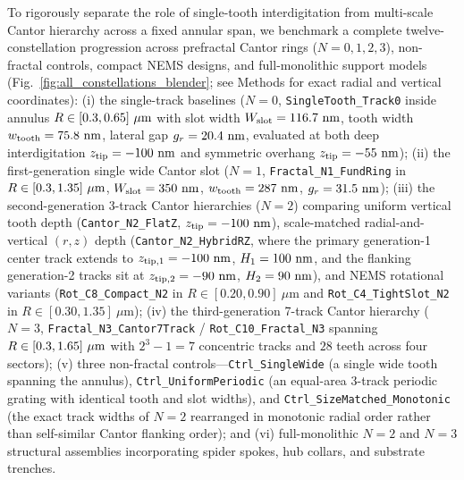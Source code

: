 \documentclass[11pt,letterpaper]{article}
\begin{document}
To rigorously separate the role of single-tooth interdigitation from multi-scale Cantor hierarchy across a fixed annular span, we benchmark a complete twelve-constellation progression across prefractal Cantor rings ($N=0, 1, 2, 3$), non-fractal controls, compact NEMS designs, and full-monolithic support models (Fig.~\ref{fig:all_constellations_blender}; see Methods for exact radial and vertical coordinates): (i) the single-track baselines ($N=0$, \texttt{SingleTooth\_Track0} inside annulus $R \in [0.3{}, 0.65{}]\ \mu\text{m}$ with slot width $W_{\rm slot} = 116.7{}\text{ nm}$, tooth width $w_{\rm tooth} = 75.8{}\text{ nm}$, lateral gap $g_r = 20.4{}\text{ nm}$, evaluated at both deep interdigitation $z_{\rm tip} = -100\text{ nm}$ and symmetric overhang $z_{\rm tip} = -55\text{ nm}$); (ii) the first-generation single wide Cantor slot ($N=1$, \texttt{Fractal\_N1\_FundRing} in $R \in [\FractalNoneFundringRInUm{}, \FractalNoneFundringROutUm{}]\ \mu\text{m}$, $W_{\rm slot} = 350{}\text{ nm}$, $w_{\rm tooth} = 287{}\text{ nm}$, $g_r = 31.5{}\text{ nm}$); (iii) the second-generation 3-track Cantor hierarchies ($N=2$) comparing uniform vertical tooth depth (\texttt{Cantor\_N2\_FlatZ}, $z_{\rm tip} = -100\text{ nm}$), scale-matched radial-and-vertical $(r,z)$ depth (\texttt{Cantor\_N2\_HybridRZ}, where the primary generation-1 center track extends to $z_{\rm tip,1} = -100{}\text{ nm}$, $H_1 = 100{}\text{ nm}$, and the flanking generation-2 tracks sit at $z_{\rm tip,2} = -90{}\text{ nm}$, $H_2 = 90{}\text{ nm}$), and NEMS rotational variants (\texttt{Rot\_C8\_Compact\_N2} in $R \in [0.20, 0.90]\ \mu\text{m}$ and \texttt{Rot\_C4\_TightSlot\_N2} in $R \in [0.30, 1.35]\ \mu\text{m}$); (iv) the third-generation 7-track Cantor hierarchy ($N=3$, \texttt{Fractal\_N3\_Cantor7Track} / \texttt{Rot\_C10\_Fractal\_N3} spanning $R \in [0.3{}, 1.65{}]\ \mu\text{m}$ with $2^3 - 1 = 7$ concentric tracks and $28$ teeth across four sectors); (v) three non-fractal controls---\texttt{Ctrl\_SingleWide} (a single wide tooth spanning the annulus), \texttt{Ctrl\_UniformPeriodic} (an equal-area 3-track periodic grating with identical tooth and slot widths), and \texttt{Ctrl\_SizeMatched\_Monotonic} (the exact track widths of $N=2$ rearranged in monotonic radial order rather than self-similar Cantor flanking order); and (vi) full-monolithic $N=2$ and $N=3$ structural assemblies incorporating spider spokes, hub collars, and substrate trenches.
\end{document}
